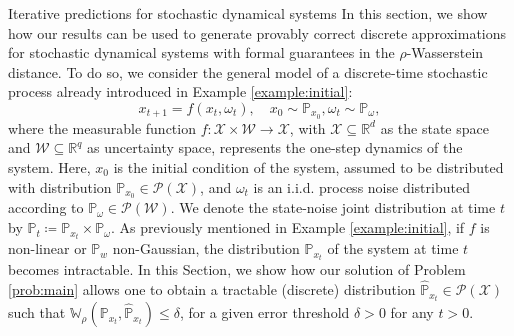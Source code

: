 \documentclass[11pt, a4paper, oneside,reqno]{amsart}
\makeatletter
\def\section{\@startsection{section}{1}%
	\z@{.7\linespacing\@plus\linespacing}{.5\linespacing}%
	{\normalfont\large\bfseries}}
\theoremstyle{plain}
\def\prob{\mathbb{P}}
\def\probHat{\hat{\mathbb{P}}}
\def\wasserstein{{\mathbb{W}}}
\def\realNum{{\mathbb{R}}}
\def\sP{{\mathcal{P}}}
\def\sW{{\mathcal{W}}}
\def\sX{{\mathcal{X}}}
\makeatother
\begin{document}
\section{Iterative predictions for stochastic dynamical systems}\label{section:dynamical-systems}
In this section, we show how our results can be used to generate provably correct discrete approximations for stochastic dynamical systems with formal guarantees in the $\rho$-Wasserstein distance. To do so, we consider the general model of a discrete-time stochastic process already introduced in Example \ref{example:initial}:
\begin{equation}\label{eq:system-def}
    x_{t+1} = f(x_t, \omega_t), \quad x_0 \sim \prob_{x_0}, \omega_t \sim \prob_\omega,
\end{equation}
where the measurable function $f:\sX \times \sW \rightarrow \sX$, 
with $\sX \subseteq \realNum^d$ as the state space and $\sW \subseteq \realNum^q$ as uncertainty space, 
represents the one-step dynamics of the system. Here, $x_0$ is the initial condition of the system, assumed to be distributed with distribution $\prob_{x_0} \in \sP(\sX)$, and $\omega_t$ is an i.i.d. process noise distributed according to $\prob_\omega \in \sP(\sW)$.
We denote the state-noise joint distribution at time \(t\) by $\prob_t \coloneqq \prob_{x_{t}} \times \prob_\omega$.
As previously mentioned in Example \ref{example:initial}, if $f$ is non-linear or $\prob_{w}$ non-Gaussian, the distribution $\prob_{x_t}$ of the system at time $t$ becomes intractable. In this Section, we show how our solution of Problem \ref{prob:main} allows one to obtain a tractable (discrete) distribution $\probHat_{x_t} \in \sP(\sX)$ such that $\wasserstein_{\rho}(\prob_{x_t}, \probHat_{x_t}) \leq \delta$, for a given error threshold $\delta > 0$ for any  $t>0$.
\end{document}
